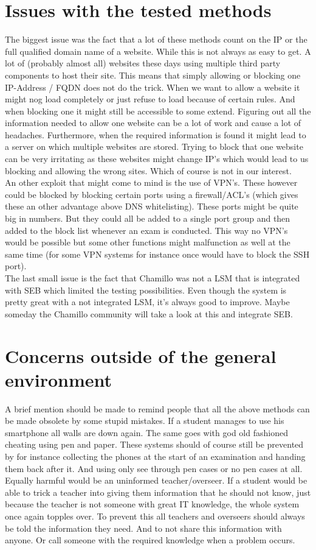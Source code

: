 \section{Issues with the tested methods}
The biggest issue was the fact that a lot of these methods count on the IP or the full qualified domain name of a website. While this is not always as easy to get. A lot of (probably almost all) websites these days using multiple third party components to host their site. This means that simply allowing or blocking one IP-Address / FQDN does not do the trick. When we want to allow a website it might nog load completely or just refuse to load because of certain rules. And when blocking one it might still be accessible to some extend. Figuring out all the information needed to allow one website can be a lot of work and cause a lot of headaches. Furthermore, when the required information is found it might lead to a server on which multiple websites are stored. Trying to block that one website can be very irritating as these websites might change IP's which would lead to us blocking and allowing the wrong sites. Which of course is not in our interest.\\
An other exploit that might come to mind is the use of VPN's. These however could be blocked by blocking certain ports using a firewall/ACL's (which gives these an other advantage above DNS whitelisting). These ports might be quite big in numbers. But they could all be added to a single port group and then added to the block list whenever an exam is conducted. This way no VPN's would be possible but some other functions might malfunction as well at the same time (for some VPN systems for instance once would have to block the SSH port).\\
The last small issue is the fact that Chamillo was not a LSM that is integrated with SEB which limited the testing possibilities. Even though the system is pretty great with a not integrated LSM, it's always good to improve. Maybe someday the Chamillo community will take a look at this and integrate SEB.
\section{Concerns outside of the general environment}
A brief mention should be made to remind people that all the above methods can be made obsolete by some stupid mistakes. If a student manages to use his smartphone all walls are down again. The same goes with god old fashioned cheating using pen and paper. These systems should of course still be prevented by for instance collecting the phones at the start of an examination and handing them back after it. And using only see through pen cases or no pen cases at all. Equally harmful would be an uninformed teacher/overseer. If a student would be able to trick a teacher into giving them information that he should not know, just because the teacher is not someone with great IT knowledge, the whole system once again topples over. To prevent this all teachers and overseers should always be told the information they need. And to not share this information with anyone. Or call someone with the required knowledge when a problem occurs.
